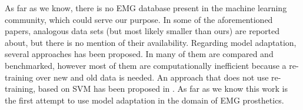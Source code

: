 As far as we know, there is no EMG database present in the machine
learning community, which could serve our purpose. In some of the
aforementioned papers, analogous data sets (but most likely smaller
than ours) are reported about, but there is no mention of their
availability.
Regarding model adaptation, several approaches has been proposed.
In \cite{daume07easyadapt} many of them are compared and benchmarked,
however most of them are computationally inefficient because a re-training
over new and old data is needed. An approach that does not use re-training,
based on SVM has been proposed in \cite{YangYH07}. As far as we know this work is the first attempt to use model adaptation in the domain of EMG
prosthetics.
